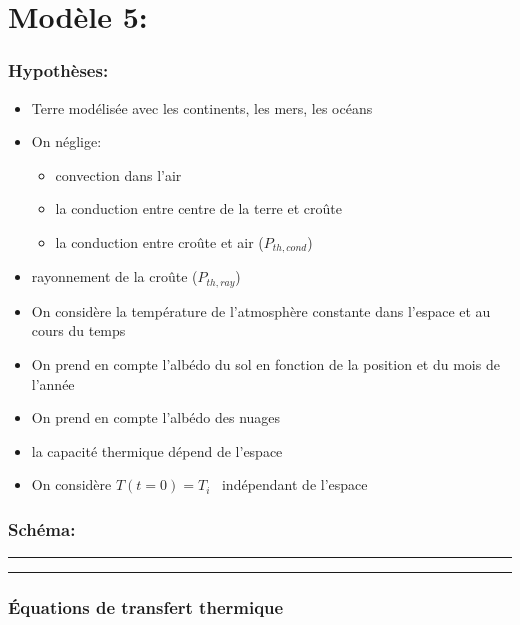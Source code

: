 \documentclass[a4paper,12pt]{article}
\begin{document}
\section*{Modèle 5: }
\subsubsection*{Hypothèses:}
\begin{itemize}
    \item Terre modélisée avec les continents, les mers, les océans 
    \item  On néglige: 
    \begin{itemize}
        \item convection dans l'air
        \item la conduction entre centre de la terre et croûte
        \item la conduction entre croûte et air (\(P_{th,cond}\))
    \end{itemize} 
    \item  rayonnement de la croûte (\(P_{th,ray}\))
    \item On considère la température de l'atmosphère constante dans l'espace et  au cours du temps 
    \item On prend en compte l'albédo du sol en fonction de la position et du mois de l'année 
    \item On prend en compte l'albédo des nuages
    \item la capacité thermique dépend de l'espace 
    \item On considère $T(t=0) = T_i$ \  indépendant de l'espace  
    
    
\end{itemize}

\subsubsection*{Schéma:} 

\noindent\textcolor{gray}{\rule{\linewidth}{0.4pt}}

  
\begin{center}
  
\end{center}
\noindent\textcolor{gray}{\rule{\linewidth}{0.4pt}}

\subsubsection*{Équations de transfert thermique}
\end{document}

